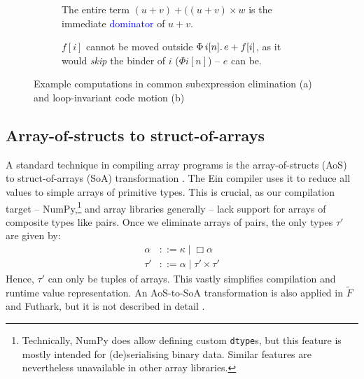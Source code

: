 \begin{figure}[b]
\centering
\begin{subfigure}{.45\textwidth}
  \centering
{}
  \caption{The entire term $(u + v) + ((u + v) \times w$ is the immediate \textcolor{blue}{dominator} of $u + v$.}
\end{subfigure}%
\quad
\begin{subfigure}{.45\textwidth}
  \centering
{}
  \caption{$f[i]$ cannot be moved outside $\Phi\, {i}[{n}] \ldotp {e + f[i]}$, as it would \textit{skip} the binder of $i$ ($\Phi i[n]$) -- $e$ can be.}
\end{subfigure}
\caption{Example computations in common subexpression elimination (a) and loop-invariant code motion (b)}
\label{fig:transform-examples}
\end{figure}

\needspace{16em}
\subsection{Array-of-structs to struct-of-arrays}
\label{aos-to-soa}

A standard technique in compiling array programs is the array-of-structs (AoS) to struct-of-arrays (SoA) transformation \cite{shaikhha2019efficient}. The Ein compiler uses it to reduce all values to simple arrays of primitive types. This is crucial, as our compilation target -- NumPy,\footnote{Technically, NumPy does allow defining custom \texttt{dtype}s, but this feature is mostly intended for (de)serialising binary data. Similar features are nevertheless unavailable in other array libraries.} and array libraries generally -- lack support for arrays of composite types like pairs. Once we eliminate arrays of pairs, the only types $\tau'$ are given by:
\begin{align*}
\alpha &::= \kappa \mid \Box \alpha \\
\tau' &::= \alpha \mid \tau' \times \tau'
\end{align*}
Hence, $\tau'$ can only be tuples of arrays. This vastly simplifies compilation and runtime value representation. An AoS-to-SoA transformation is also applied in $\tilde F$ and Futhark, but it is not described in detail \cite{henriksen2017futhark, shaikhha2019efficient}. 


